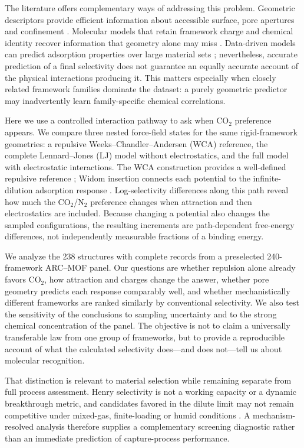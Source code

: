 \documentclass[journal=jctcce,manuscript=article]{achemso}
\begin{document}
The literature offers complementary ways of addressing this problem. Geometric descriptors provide efficient information about accessible surface, pore apertures and confinement \cite{willems2012zeopp,fernandez2016geometry}. Molecular models that retain framework charge and chemical identity recover information that geometry alone may miss \cite{nazarian2016charges,anderson2018porechemistry}. Data-driven models can predict adsorption properties over large material sets \cite{burner2020deeplearning,moosavi2020diversity}; nevertheless, accurate prediction of a final selectivity does not guarantee an equally accurate account of the physical interactions producing it. This matters especially when closely related framework families dominate the dataset: a purely geometric predictor may inadvertently learn family-specific chemical correlations.

Here we use a controlled interaction pathway to ask when CO$_2$ preference appears. We compare three nested force-field states for the same rigid-framework geometries: a repulsive Weeks--Chandler--Andersen (WCA) reference, the complete Lennard--Jones (LJ) model without electrostatics, and the full model with electrostatic interactions. The WCA construction provides a well-defined repulsive reference \cite{weeks1971wca}; Widom insertion connects each potential to the infinite-dilution adsorption response \cite{widom1963}. Log-selectivity differences along this path reveal how much the CO$_2$/N$_2$ preference changes when attraction and then electrostatics are included. Because changing a potential also changes the sampled configurations, the resulting increments are path-dependent free-energy differences, not independently measurable fractions of a binding energy.

We analyze the 238 structures with complete records from a preselected 240-framework ARC--MOF panel. Our questions are whether repulsion alone already favors CO$_2$, how attraction and charges change the answer, whether pore geometry predicts each response comparably well, and whether mechanistically different frameworks are ranked similarly by conventional selectivity. We also test the sensitivity of the conclusions to sampling uncertainty and to the strong chemical concentration of the panel. The objective is not to claim a universally transferable law from one group of frameworks, but to provide a reproducible account of what the calculated selectivity does---and does not---tell us about molecular recognition.

That distinction is relevant to material selection while remaining separate from full process assessment. Henry selectivity is not a working capacity or a dynamic breakthrough metric, and candidates favored in the dilute limit may not remain competitive under mixed-gas, finite-loading or humid conditions \cite{farmahini2021screening,farmahini2020process}. A mechanism-resolved analysis therefore supplies a complementary screening diagnostic rather than an immediate prediction of capture-process performance.
\end{document}
